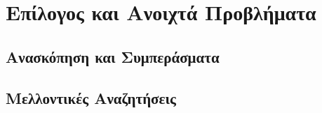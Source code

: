 

\chapter{Επίλογος και Ανοιχτά Προβλήματα}\label{ch:conclusion}
\section{Ανασκόπηση και Συμπεράσματα}

\section{Μελλοντικές Αναζητήσεις}